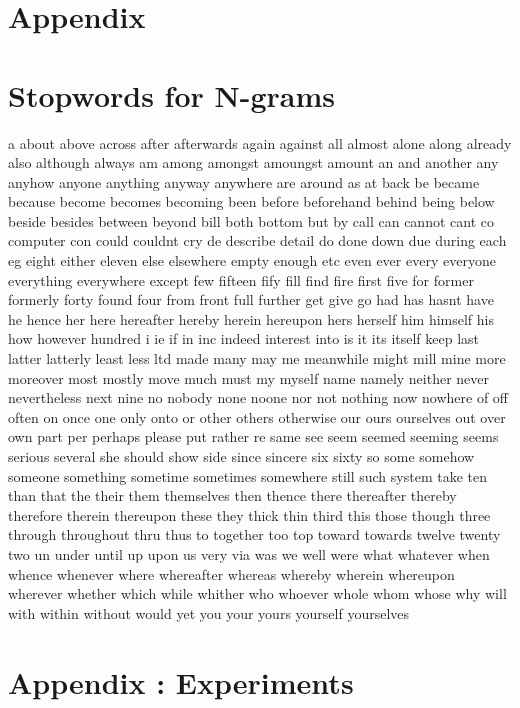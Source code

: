 
\renewcommand{\theequation}{B\arabic{equation}}
\setcounter{equation}{0}
\renewcommand{\thefigure}{B\arabic{figure}}
\setcounter{figure}{0}
\renewcommand{\thetable}{B\arabic{table}}
\setcounter{table}{0}


\clearpage

\thesisappendix

\section{Appendix \label{A}}


\section{Stopwords for N-grams}
\label{sec:appendix-stopwords}

a
about
above
across
after
afterwards
again
against
all
almost
alone
along
already
also
although
always
am
among
amongst
amoungst
amount
an
and
another
any
anyhow
anyone
anything
anyway
anywhere
are
around
as
at
back
be
became
because
become
becomes
becoming
been
before
beforehand
behind
being
below
beside
besides
between
beyond
bill
both
bottom
but
by
call
can
cannot
cant
co
computer
con
could
couldnt
cry
de
describe
detail
do
done
down
due
during
each
eg
eight
either
eleven
else
elsewhere
empty
enough
etc
even
ever
every
everyone
everything
everywhere
except
few
fifteen
fify
fill
find
fire
first
five
for
former
formerly
forty
found
four
from
front
full
further
get
give
go
had
has
hasnt
have
he
hence
her
here
hereafter
hereby
herein
hereupon
hers
herself
him
himself
his
how
however
hundred
i
ie
if
in
inc
indeed
interest
into
is
it
its
itself
keep
last
latter
latterly
least
less
ltd
made
many
may
me
meanwhile
might
mill
mine
more
moreover
most
mostly
move
much
must
my
myself
name
namely
neither
never
nevertheless
next
nine
no
nobody
none
noone
nor
not
nothing
now
nowhere
of
off
often
on
once
one
only
onto
or
other
others
otherwise
our
ours
ourselves
out
over
own
part
per
perhaps
please
put
rather
re
same
see
seem
seemed
seeming
seems
serious
several
she
should
show
side
since
sincere
six
sixty
so
some
somehow
someone
something
sometime
sometimes
somewhere
still
such
system
take
ten
than
that
the
their
them
themselves
then
thence
there
thereafter
thereby
therefore
therein
thereupon
these
they
thick
thin
third
this
those
though
three
through
throughout
thru
thus
to
together
too
top
toward
towards
twelve
twenty
two
un
under
until
up
upon
us
very
via
was
we
well
were
what
whatever
when
whence
whenever
where
whereafter
whereas
whereby
wherein
whereupon
wherever
whether
which
while
whither
who
whoever
whole
whom
whose
why
will
with
within
without
would
yet
you
your
yours
yourself
yourselves

\clearpage
\section{Appendix \label{B}: Experiments}



